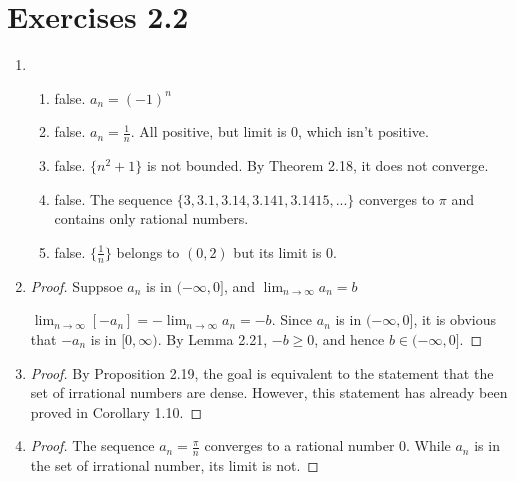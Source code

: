 \documentclass{article}
\begin{document}
\section*{Exercises 2.2}
\begin{enumerate}
\item
  \begin{enumerate}[label=\alph*.]
  \item false. $a_n = (-1)^{n}$
  \item false. $a_n = \frac{1}{n}$. All positive, but limit is $0$, which isn't positive.
  \item false. $\{n^2+1\}$ is not bounded. By Theorem 2.18, it does not converge.
  \item false. The sequence $\{3,3.1,3.14,3.141,3.1415,...\}$ converges to $\pi$ and contains only rational numbers. 
  \item false. $\{\frac{1}{n}\}$ belongs to $(0,2)$ but its limit is $0$.
  \end{enumerate}
\item
  \begin{proof}
    Suppsoe $a_n$ is in $(-\infty,0]$, and $\lim_{n\rightarrow \infty}a_n = b$
    
    $\lim_{n \rightarrow \infty}[-a_n] = - \lim_{n \rightarrow \infty}a_n = -b$.
    Since $a_n$ is in $(-\infty,0]$, it is obvious that $-a_n$ is in $[0,\infty)$. By Lemma 2.21, $-b \geq 0$, and hence $b \in (-\infty,0]$.
\end{proof}
\item
  \begin{proof}
    By Proposition 2.19, the goal is equivalent to the statement that the set of irrational numbers are dense. However, this statement has already been proved in Corollary 1.10.
  \end{proof}
\item
  \begin{proof}
    The sequence $a_n = \frac{\pi}{n}$ converges to a rational number $0$. While $a_n$ is in the set of irrational number, its limit is not.
  \end{proof}


\end{enumerate}
\end{document}
